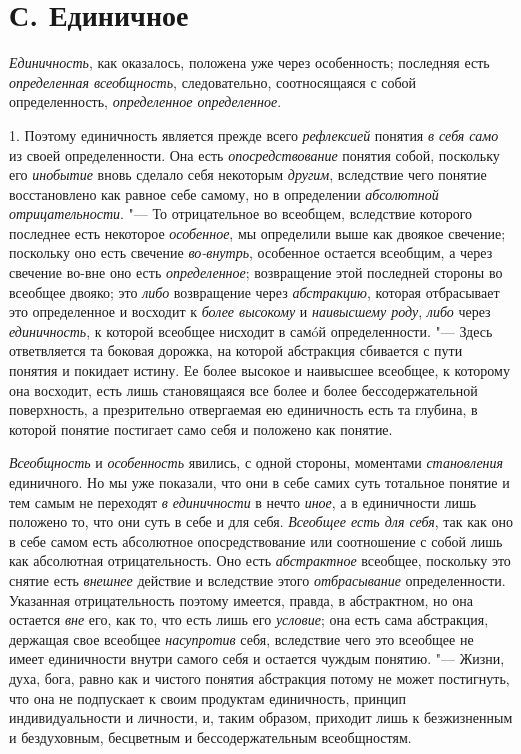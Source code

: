 \section[С. Единичное]{С. Единичное}
{\em Единичность}, как
оказалось, положена уже через особенность; последняя есть
{\em определенная всеобщность},
следовательно, соотносящаяся с собой определенность,
{\em определенное определенное}.

1. Поэтому единичность является прежде всего
{\em рефлексией} понятия
{\em в себя само }из
своей определенности. Она есть
{\em опосредствование}
понятия собой, поскольку его
{\em инобытие} вновь
сделало себя некоторым {\em другим},
вследствие чего понятие восстановлено как равное себе самому,
но в определении {\em абсолютной
отрицательности}. "--- То отрицательное во всеобщем, вследствие
которого последнее есть некоторое
{\em особенное}, мы
определили
выше
как двоякое свечение; поскольку оно есть свечение
{\em во-внутрь},
особенное остается всеобщим, а через свечение во-вне оно есть
{\em определенное};
возвращение этой последней стороны во всеобщее двояко; это
{\em либо} возвращение
через {\em абстракцию},
которая отбрасывает это определенное и восходит к
{\em более высокому} и
{\em наивысшему роду},
{\em либо} через
{\em единичность}, к
которой всеобщее нисходит в самóй определенности. "--- Здесь
ответвляется та боковая дорожка, на которой абстракция сбивается с пути
понятия и покидает истину. Ее более высокое и наивысшее всеобщее, к
которому она восходит, есть лишь становящаяся все более и более
бессодержательной поверхность, а презрительно отвергаемая ею единичность
есть та глубина, в которой понятие постигает само себя и положено как
понятие.

{\em Всеобщность} и
{\em особенность}
явились, с одной стороны, моментами
{\em становления}
единичного. Но мы уже показали, что они в себе самих суть
тотальное понятие и тем самым не переходят
{\em в единичности} в
нечто {\em иное}, а в
единичности лишь положено то, что они суть в себе и для себя.
{\em Всеобщее есть для себя},
так как оно в себе самом есть абсолютное опосредствование или
соотношение с собой лишь как абсолютная отрицательность. Оно есть
{\em абстрактное}
всеобщее, поскольку это снятие есть
{\em внешнее} действие и
вследствие этого {\em отбрасывание}
определенности. Указанная отрицательность поэтому имеется,
правда, в абстрактном, но она остается
{\em вне} его, как то,
что есть лишь его {\em условие};
она есть сама абстракция, держащая свое всеобщее
{\em насупротив} себя,
вследствие чего это всеобщее не имеет единичности внутри самого себя и
остается чуждым понятию. "--- Жизни, духа, бога, равно как и
чистого понятия абстракция потому не может постигнуть, что она не
подпускает к своим продуктам единичность, принцип индивидуальности и
личности, и, таким образом, приходит лишь к безжизненным и бездуховным,
бесцветным и бессодержательным всеобщностям.

